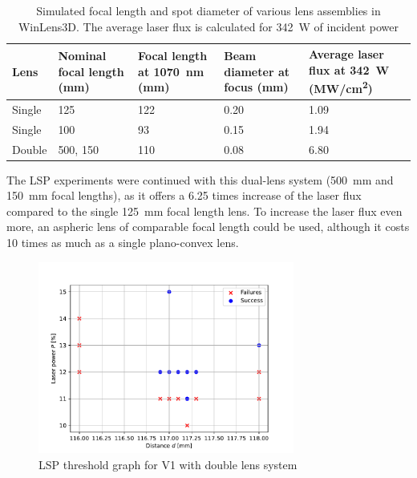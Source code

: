             \begin{table}[!ht]
                \centering
                \caption{Simulated focal length and spot diameter of various lens assemblies in WinLens3D. The average laser flux is calculated for \qty{342}{W} of incident power}
                \label{tab:laser flux}
                \begin{tabularx}{\textwidth}{@{}lX<{\raggedright}X<{\raggedright}X<{\raggedright}X<{\raggedright}@{}}
                \toprule
                Lens & Nominal focal length (\unit{mm}) & Focal length at \qty{1070}{nm} (\unit{mm})& Beam diameter at focus (\unit{mm}) & Average laser flux at \qty{342}{W} (\unit{MW/cm^2}) \\ \midrule
                Single & 125           &  122  &    0.20   &  1.09 \\
                Single & 100           &  93   &    0.15   &  1.94 \\
                Double & 500, 150      &  110  &    0.08   &  6.80 \\ %
                \bottomrule
                \end{tabularx}
            \end{table}
            The LSP experiments were continued with this dual-lens system (\qty{500}{mm} and \qty{150}{mm} focal lengths), as it offers a 6.25 times increase of the laser flux compared to the single \qtylist{125}{mm} focal length lens. To increase the laser flux even more, an aspheric lens of comparable focal length could be used, although it costs 10 times as much as a single plano-convex lens.

            \begin{figure}[!ht]
                \centering
                \includegraphics[width=0.75\textwidth]{assets/4 experiments/duallens_focus_threshold.pdf}
                \caption{LSP threshold graph for V1 with double lens system}
            \end{figure}
            
